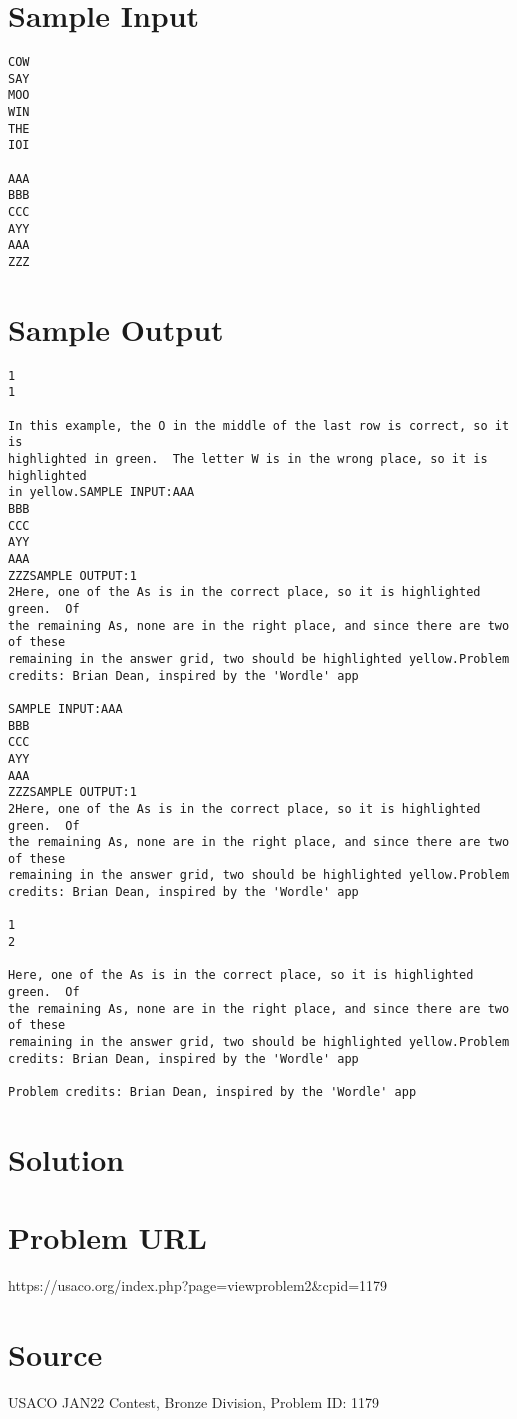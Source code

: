 \documentclass[12pt]{article}
\begin{document}
\section*{Sample Input}
\begin{verbatim}
COW
SAY
MOO
WIN
THE
IOI

AAA
BBB
CCC
AYY
AAA
ZZZ
\end{verbatim}

\section*{Sample Output}
\begin{verbatim}
1
1

In this example, the O in the middle of the last row is correct, so it is 
highlighted in green.  The letter W is in the wrong place, so it is highlighted
in yellow.SAMPLE INPUT:AAA
BBB
CCC
AYY
AAA
ZZZSAMPLE OUTPUT:1
2Here, one of the As is in the correct place, so it is highlighted green.  Of
the remaining As, none are in the right place, and since there are two of these
remaining in the answer grid, two should be highlighted yellow.Problem credits: Brian Dean, inspired by the 'Wordle' app

SAMPLE INPUT:AAA
BBB
CCC
AYY
AAA
ZZZSAMPLE OUTPUT:1
2Here, one of the As is in the correct place, so it is highlighted green.  Of
the remaining As, none are in the right place, and since there are two of these
remaining in the answer grid, two should be highlighted yellow.Problem credits: Brian Dean, inspired by the 'Wordle' app

1
2

Here, one of the As is in the correct place, so it is highlighted green.  Of
the remaining As, none are in the right place, and since there are two of these
remaining in the answer grid, two should be highlighted yellow.Problem credits: Brian Dean, inspired by the 'Wordle' app

Problem credits: Brian Dean, inspired by the 'Wordle' app
\end{verbatim}

\section*{Solution}


\section*{Problem URL}
https://usaco.org/index.php?page=viewproblem2&cpid=1179

\section*{Source}
USACO JAN22 Contest, Bronze Division, Problem ID: 1179
\end{document}
